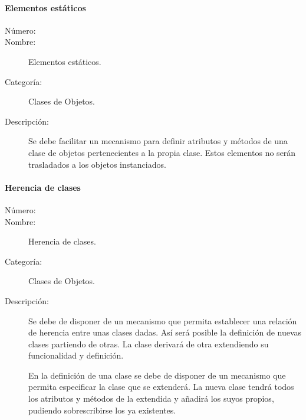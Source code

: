 \paragraph{Elementos estáticos}
	\begin{description}
		\item [Número:] \cn
		\item [Nombre:] Elementos estáticos.
		\item [Categoría:] Clases de Objetos.
		\item [Descripción:] Se debe facilitar un mecanismo para definir atributos y métodos de una clase de objetos pertenecientes
      a la propia clase. Estos elementos no serán trasladados a los objetos instanciados.
	\end{description}

\paragraph{Herencia de clases}
	\begin{description}
		\item [Número:] \cn
		\item [Nombre:] Herencia de clases.
		\item [Categoría:] Clases de Objetos.
		\item [Descripción:] Se debe de disponer de un mecanismo que permita establecer una relación de herencia entre unas clases dadas. 
		Así será posible la definición de nuevas clases partiendo de otras. La clase derivará de otra extendiendo su funcionalidad y definición. 
		
		En la definición de una clase se debe de disponer de un mecanismo que permita especificar la clase que se extenderá. La nueva clase tendrá todos 
		los atributos y métodos de la extendida y añadirá los suyos propios, pudiendo sobrescribirse los ya existentes.
	\end{description}

